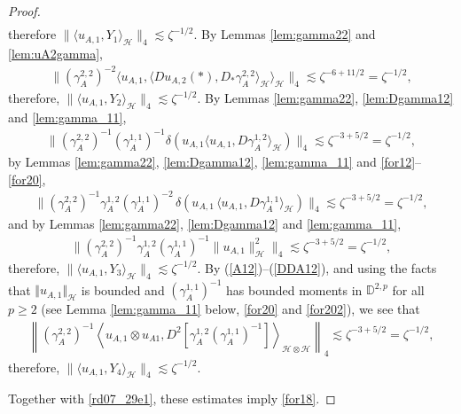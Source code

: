\documentclass[12pt,a4paper]{article}
\newcommand{\HH}{\mathcal{H}}
\newcommand {\deltah}{{\zeta}}
\newcommand{\<}{\langle}
\renewcommand{\>}{\rangle}
\begin{document}
\begin{proof}
\begin{align*}
         \end{align*}
 therefore $ \| \langle u_{A,1}, Y_1\rangle_\HH  \|_4 \lesssim \deltah^{-1/2}$. By Lemmas \ref{lem:gamma22} and \ref{lem:uA2gamma},
         \begin{align*}
         \| (\gamma_A^{2,2})^{-2}\langle u_{A,1}, \langle Du_{A,2}(*), D_*\gamma_A^{2,2}\rangle_\HH\rangle_\HH \|_4
         \lesssim \deltah^{-6+11/2}=\deltah^{-1/2},
         \end{align*}
therefore,  $ \| \langle u_{A,1}, Y_2\rangle_\HH  \|_4 \lesssim \deltah^{-1/2}$.    By Lemmas \ref{lem:gamma22}, \ref{lem:Dgamma12} and \ref{lem:gamma_11},
         \begin{align*}
         \|(\gamma_{A} ^{2,2})^{-1} 
     ( \gamma_{A} ^{1,1})^{-1}\delta(u_{A,1}  \langle u_{A,1},  D\gamma_{A} ^{1,2} \rangle_\HH)\|_4          \lesssim \deltah^{-3+5/2}=\deltah^{-1/2},
         \end{align*}
 by Lemmas \ref{lem:gamma22}, \ref{lem:Dgamma12}, \ref{lem:gamma_11} and \eqref{for12}--\eqref{for20},
        \begin{align*}
        \| ( \gamma_{A} ^{2,2})^{-1}\gamma_{A} ^{1,2}( \gamma_{A} ^{1,1})^{-2}\, \delta(u_{A,1}\, \langle u_{A,1}, D\gamma_A^{1,1}\rangle_\HH )\|_4\lesssim \deltah^{-3+5/2}=\deltah^{-1/2},
        \end{align*}
and by  Lemmas \ref{lem:gamma22}, \ref{lem:Dgamma12} and \ref{lem:gamma_11},
        \begin{align*}
        \|(\gamma_{A} ^{2,2})^{-1}   \gamma_{A} ^{1,2}
     ( \gamma_{A} ^{1,1})^{-1} \|u_{A,1} \|^{2}_\HH\|_4 \lesssim  \deltah^{-3+5/2} =\deltah^{-1/2},
        \end{align*}  
therefore,  $ \| \langle u_{A,1}, Y_3 \rangle_\HH  \|_4 \lesssim \deltah^{-1/2}$.    By  (\ref{A12})--(\ref{DDA12}), and using the facts that $\Vert u_{A, 1} \Vert_\HH$ is bounded and $(\gamma_A^{1,1})^{-1}$ has bounded moments in $\mathbb{D}^{2,p} $ for all $p\ge 2$ (see Lemma \ref{lem:gamma_11} below, \eqref{for20} and \eqref{for202}), we see that
 \begin{align*}
   \left\| (\gamma_{A} ^{2,2})^{-1} \left \langle u_{A,1}\otimes u_{A1} ,D^2[  \gamma_{A} ^{1,2}
     ( \gamma_{A} ^{1,1})^{-1} ] \right\rangle_{\HH\otimes \HH} \right\|_4 \lesssim  \deltah^{-3 +5/2}  =\deltah^{-1/2},
 \end{align*}
 therefore, $ \| \langle u_{A,1}, Y_4 \rangle_\HH  \|_4 \lesssim \deltah^{-1/2}$.  

   Together with \eqref{rd07_29e1}, these estimates  imply \eqref{for18}.
  \end{proof} 
\end{document}
